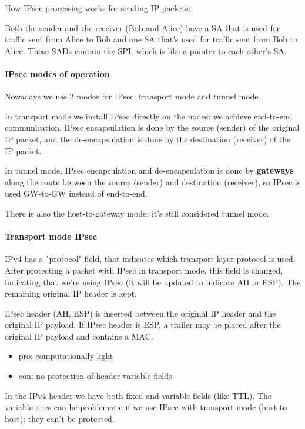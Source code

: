 How IPsec processing works for sending IP packets:


Both the sender and the receiver (Bob and Alice) have a SA that is used for traffic sent from Alice to Bob and one SA that's used for traffic sent from Bob to Alice. These SADs contain the SPI, which is like a pointer to each other's SA.

\paragraph{IPsec modes of operation}
Nowadays we use 2 modes for IPsec: transport mode and tunnel mode.

In transport mode we install IPsec directly on the nodes: we achieve end-to-end communication. IPsec encapsulation is done by the source (sender) of the original IP packet, and the de-encapsulation is done by the destination (receiver) of the IP packet.

In tunnel mode, IPsec encapsulation and de-encapsulation is done by \textbf{gateways} along the route between the source (sender) and destination (receiver), so IPsec is used GW-to-GW instead of end-to-end.

There is also the host-to-gateway mode: it's still considered tunnel mode.

\paragraph{Transport mode IPsec}
IPv4 has a "protocol" field, that indicates which transport layer protocol is used. After protecting a packet with IPsec in transport mode, this field is changed, indicating that we're using IPsec (it will be updated to indicate AH or ESP). The remaining original IP header is kept.

IPsec header (AH, ESP) is inserted between the original IP header and the original IP payload. If IPsec header is ESP, a trailer may be placed after the original IP payload and contains a MAC.
\begin{itemize}
    \item pro: computationally light
    \item con: no protection of header variable fields
\end{itemize}

In the IPv4 header we have both fixed and variable fields (like TTL). The variable ones can be problematic if we use IPsec with transport mode (host to host): they can't be protected.

